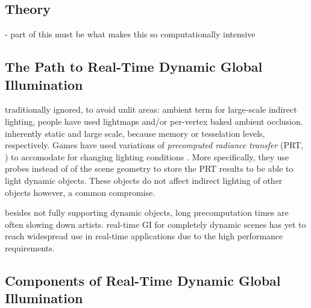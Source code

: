 
\subsection{Theory}

- part of this must be what makes this so computationally intensive


\subsection{The Path to Real-Time Dynamic Global Illumination}

\begin{outline}
\1 traditionally ignored, to avoid unlit areas: ambient term
\1 for large-scale indirect lighting, people have used lightmaps and/or per-vertex baked ambient occlusion. inherently static and large scale, because memory or tesselation levels, respectively.
\1 Games have used variations of \emph{precomputed radiance transfer} (PRT, \cite{sloan:2002:PRT}) to accomodate for changing lighting conditions \cite{stefanov:2012:PRTinFarCry3}. More specifically, they use probes instead of of the scene geometry to store the PRT results to be able to light dynamic objects. These objects do not affect indirect lighting of other objects however, a common compromise.

\1 besides not fully supporting dynamic objects, long precomputation times are often slowing down artists.
\1 real-time GI for completely dynamic scenes has yet to reach widespread use in real-time applications due to the high performance requirements.
\end{outline}


\subsection{Components of Real-Time Dynamic Global Illumination}
\label{sec:componentsOfGI}


